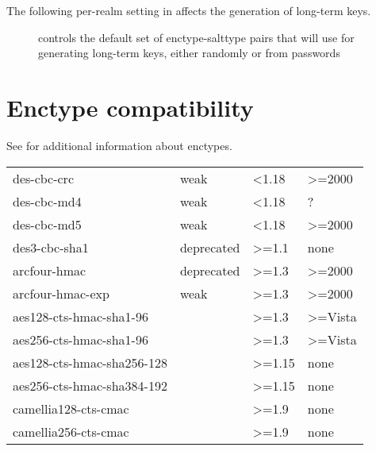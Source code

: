 \documentclass[letterpaper,10pt,english]{sphinxmanual}
\begin{document}
The following per-realm setting in {\hyperref[\detokenize{admin/conf_files/kdc_conf:kdc-conf-5}]{}} affects the
generation of long-term keys.
\begin{description}
\item[{}] \leavevmode
controls the default set of enctype-salttype pairs that {\hyperref[\detokenize{admin/admin_commands/kadmind:kadmind-8}]{}}
will use for generating long-term keys, either randomly or from
passwords

\end{description}


\section{Enctype compatibility}
\label{\detokenize{admin/enctypes:enctype-compatibility}}
See {\hyperref[\detokenize{admin/conf_files/kdc_conf:encryption-types}]{}} for additional information about enctypes.


\begin{savenotes}\sphinxattablestart
\centering
\begin{tabulary}{\linewidth}[t]{|T|T|T|T|}
\hline
{}\relax &\relax &\relax &\relax \\
\hline
des-cbc-crc
&
weak
&
\textless{}1.18
&
\textgreater{}=2000
\\
\hline
des-cbc-md4
&
weak
&
\textless{}1.18
&
?
\\
\hline
des-cbc-md5
&
weak
&
\textless{}1.18
&
\textgreater{}=2000
\\
\hline
des3-cbc-sha1
&
deprecated
&
\textgreater{}=1.1
&
none
\\
\hline
arcfour-hmac
&
deprecated
&
\textgreater{}=1.3
&
\textgreater{}=2000
\\
\hline
arcfour-hmac-exp
&
weak
&
\textgreater{}=1.3
&
\textgreater{}=2000
\\
\hline
aes128-cts-hmac-sha1-96
&&
\textgreater{}=1.3
&
\textgreater{}=Vista
\\
\hline
aes256-cts-hmac-sha1-96
&&
\textgreater{}=1.3
&
\textgreater{}=Vista
\\
\hline
aes128-cts-hmac-sha256-128
&&
\textgreater{}=1.15
&
none
\\
\hline
aes256-cts-hmac-sha384-192
&&
\textgreater{}=1.15
&
none
\\
\hline
camellia128-cts-cmac
&&
\textgreater{}=1.9
&
none
\\
\hline
camellia256-cts-cmac
&&
\textgreater{}=1.9
&
none
\\
\hline
\end{tabulary}
\par
\sphinxattableend\end{savenotes}
\end{document}
